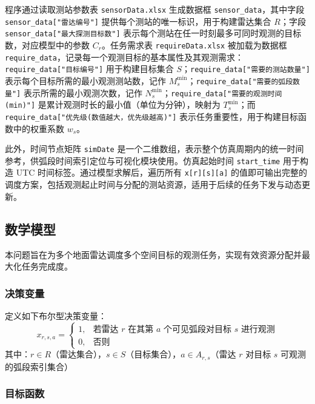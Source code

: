 \documentclass[openany,12pt,UTF8]{ctexart}
\begin{document}
程序通过读取测站参数表 \texttt{sensorData.xlsx} 生成数据框 \texttt{sensor\_data}，其中字段 \texttt{sensor\_data["雷达编号"]} 提供每个测站的唯一标识，用于构建雷达集合 $R$；字段 \texttt{sensor\_data["最大探测目标数"]} 表示每个测站在任一时刻最多可同时观测的目标数，对应模型中的参数 $C_r$。任务需求表 \texttt{requireData.xlsx} 被加载为数据框 \texttt{require\_data}，记录每一个观测目标的基本属性及其观测需求：\texttt{require\_data["目标编号"]} 用于构建目标集合 $S$；\texttt{require\_data["需要的测站数量"]} 表示每个目标所需的最小观测测站数，记作 $M_s^{\min}$；\texttt{require\_data["需要的弧段数量"]} 表示所需的最小观测次数，记作 $N_s^{\min}$；\texttt{require\_data["需要的观测时间(min)"]} 是累计观测时长的最小值（单位为分钟），映射为 $T_s^{\min}$；而 \texttt{require\_data["优先级(数值越大，优先级越高)"]} 表示任务重要性，用于构建目标函数中的权重系数 $w_s$。

此外，时间节点矩阵 \texttt{simDate} 是一个二维数组，表示整个仿真周期内的统一时间参考，供弧段时间索引定位与可视化模块使用。仿真起始时间 \texttt{start\_time} 用于构造 UTC 时间标签。通过模型求解后，遍历所有 \texttt{x[r][s][a]} 的值即可输出完整的调度方案，包括观测起止时间与分配的测站资源，适用于后续的任务下发与动态更新。

\subsection{数学模型}
本问题旨在为多个地面雷达调度多个空间目标的观测任务，实现有效资源分配并最大化任务完成度。
\subsubsection{决策变量}
定义如下布尔型决策变量：
$$
    x_{r,s,a} =
    \begin{cases}
        1, & \text{若雷达 } r \text{ 在其第 } a \text{ 个可见弧段对目标 } s \text{ 进行观测} \\
        0, & \text{否则}
    \end{cases}
$$
其中：$r \in R$（雷达集合），$s \in S$（目标集合），$a \in A_{r,s}$（雷达 $r$ 对目标 $s$ 可观测的弧段索引集合）

\subsubsection{目标函数}
\end{document}

